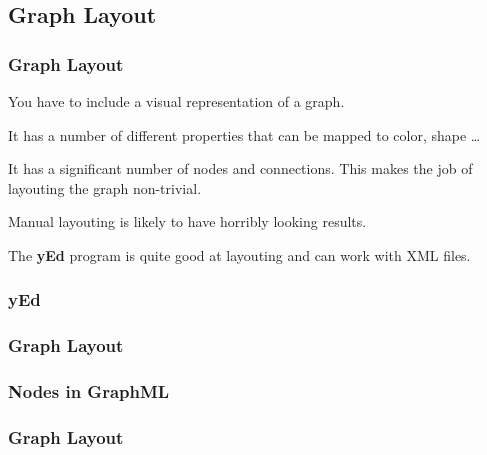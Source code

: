 {\subsection{Graph Layout}
\begin{frame}[fragile]
  \frametitle{Graph Layout}
  \pause
  \vspace{3mm}
  You have to include a visual representation of a graph.
  
  \vspace{5mm}
  It has a number of different properties that can be mapped to color, shape \ldots
  
  \pause
  \vspace{5mm}
  It has a significant number of nodes and connections. This makes the job of layouting the graph non-trivial.
  
  \vspace{5mm}
  Manual layouting is likely to have horribly looking results.
  
  \pause
  \vspace{5mm}
  The \textbf{yEd} program is quite good at layouting and can work with XML files.
\end{frame}

\subsubsection{yEd}
\begin{frame}[fragile]
  \frametitle{Graph Layout }
  
\end{frame}

\subsubsection{Nodes in GraphML}
\begin{frame}[fragile]
  \frametitle{Graph Layout }
  \vspace{-2mm}
  

\end{frame}}
